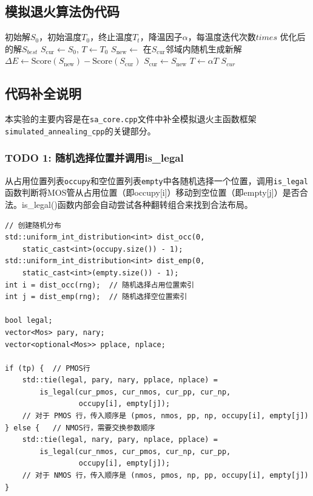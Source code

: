 \documentclass[UTF8,12pt,a4paper]{ctexart}
\begin{document}
\subsection{模拟退火算法伪代码}

\begin{algorithm}[H]
	\caption{模拟退火算法 Simulated Annealing}
	\begin{algorithmic}[1]
		\Require 初始解$S_0$，初始温度$T_0$，终止温度$T_t$，降温因子$\alpha$，每温度迭代次数$times$
		\Ensure 优化后的解$S_{best}$
		\State $S_{\text{cur}} \gets S_0$, $T \gets T_0$
				\State $S_{\text{new}} \gets$ 在$S_{\text{cur}}$邻域内随机生成新解
					\State $\Delta E \gets \text{Score}(S_{\text{new}}) - \text{Score}(S_{\text{cur}})$
						\State $S_{\text{cur}} \gets S_{\text{new}}$ 
					\EndIf
				\EndIf
			\EndFor
			\State $T \gets \alpha T$ 
		\EndWhile
		\State \Return $S_{cur}$
	\end{algorithmic}
\end{algorithm}

\subsection{代码补全说明}

本实验的主要内容是在\texttt{sa\_core.cpp}文件中补全模拟退火主函数框架\texttt{simulated\_annealing\_cpp}的关键部分。

\subsubsection{TODO 1: 随机选择位置并调用is\_legal}

从占用位置列表\texttt{occupy}和空位置列表\texttt{empty}中各随机选择一个位置，调用\texttt{is\_legal}函数判断将MOS管从占用位置（即occupy[i]）移动到空位置（即empty[j]）是否合法。is\_legal()函数内部会自动尝试各种翻转组合来找到合法布局。
\begin{lstlisting}
// 创建随机分布
std::uniform_int_distribution<int> dist_occ(0, 
    static_cast<int>(occupy.size()) - 1);
std::uniform_int_distribution<int> dist_emp(0, 
    static_cast<int>(empty.size()) - 1);
int i = dist_occ(rng);  // 随机选择占用位置索引
int j = dist_emp(rng);  // 随机选择空位置索引

bool legal;
vector<Mos> pary, nary;
vector<optional<Mos>> pplace, nplace;

if (tp) {  // PMOS行
    std::tie(legal, pary, nary, pplace, nplace) = 
        is_legal(cur_pmos, cur_nmos, cur_pp, cur_np, 
                 occupy[i], empty[j]);
	// 对于 PMOS 行，传入顺序是 (pmos, nmos, pp, np, occupy[i], empty[j])
} else {   // NMOS行，需要交换参数顺序
    std::tie(legal, nary, pary, nplace, pplace) = 
        is_legal(cur_nmos, cur_pmos, cur_np, cur_pp, 
                 occupy[i], empty[j]);
	// 对于 NMOS 行，传入顺序是 (nmos, pmos, np, pp, occupy[i], empty[j])
}
\end{lstlisting}
\end{document}
